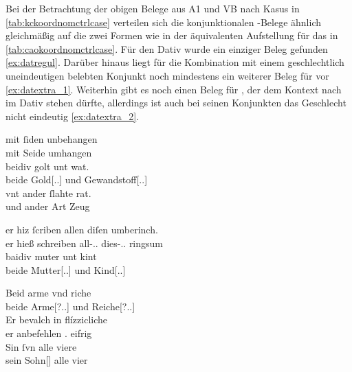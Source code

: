 Bei der Betrachtung der obigen Belege aus A1 und VB nach
Kasus in \cref{tab:kckoordnomctrlcase} verteilen sich die konjunktionalen
-Belege ähnlich gleichmäßig auf die zwei Formen wie in der
äquivalenten Aufstellung für das \CAO{} in
\cref{tab:caokoordnomctrlcase}. Für den Dativ wurde ein einziger Beleg gefunden
\cref{ex:datregul}. Darüber hinaus liegt für die Kombination mit einem
geschlechtlich uneindeutigen belebten Konjunkt noch mindestens ein weiterer
Beleg für  vor \cref{ex:datextra_1}. Weiterhin gibt es noch
einen Beleg für , der dem Kontext nach im Dativ stehen dürfte,
allerdings ist auch bei seinen Konjunkten das Geschlecht nicht eindeutig
\cref{ex:datextra_2}.

\begin{exe}
\ex \label{ex:datregul}
	\gll mit ſiden unbehangen \\
		mit Seide umhangen \\
\sn \gll beidiv golt unt wat. \\
		beide Gold[\Dat.\Sg.\NeutI] und Gewandstoff[\Dat.\Sg.\FemI] \\
\sn \gll vnt ander ſlahte rat. \\
		und ander Art Zeug \\
	\begin{taggedline}{\parencites[7ra,23--25]{kc:A1}[1543--1545]{schroeder1895}}
	\trans {}
	\end{taggedline}

\ex \label{ex:datextra}
	\begin{xlist}
	\ex \label{ex:datextra_1}
		\gll er hiz ſcriben allen diſen umberinch. \\
			er hieß schreiben all-\Dat.\Pl.\St{} dies-\Dat.\Pl.\St{} ringsum \\
	\sn \gll baidiv muter unt kint \\
			beide Mutter[\Dat.\Sg.\FemF] und Kind[\Dat.\Sg.\NeutA] \\
		\begin{taggedline}{\parencites[\pno~3rb,46--\pno~3va,1]{kc:A1}[617--618]{schroeder1895}}
		\trans {}
		\end{taggedline}

	\ex \label{ex:datextra_2}
		\gll Beid arme vnd riche \\
			beide Arme[\Dat?.\Pl.\MascA] und Reiche[\Dat?.\Pl.\MascA] \\
	\sn \gll Er bevalch in flízzicliche \\
			er anbefehlen \Tpl.\Dat{} eifrig \\
	\sn \gll Sin ſvn alle viere \\
			sein Sohn[\Pl] alle vier \\
		\begin{taggedline}{\parencites[\pno~94rb,23--26]{kc:VB}[zu][13854--13855]{schroeder1895}}
		\trans {}
		\end{taggedline}
	\end{xlist}
\end{exe}

